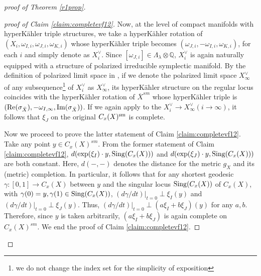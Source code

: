 \documentclass[12pt,a4paper]{amsart}
\theoremstyle{remark}
\theoremstyle{definition}
\def\Q{\mathbb{Q}}
\begin{document}
\begin{proof}[proof of Theorem \ref{r1prop}]
\begin{proof}[proof of Claim \ref{claim:completevf12}]
Now, 
at the level of 
compact 
manifolds with hyperK\"ahler triple structures, 
we take a hyperK\"ahler rotation 
of $(X_i,\omega_{I,i},\omega_{J,i},\omega_{K,i})$ 
whose hyperK\"ahler triple becomes  
$(\omega_{J,i}, -\omega_{I,i}, \omega_{K,i})$, 
for each $i$ and simply denote as 
$X_i^{\vee}$. 
Since $[\omega_{J,i}]\in \Lambda_\lambda\otimes \Q$, 
$X_i^{\vee}$ is again 
naturally equipped with a structure of 
polarized irreducible symplectic manifold. 
By the definition of polarized limit space in 
\cite[\S 2]{DSII}, if we denote 
the polarized limit space $X_\infty^{\vee}$ of 
any subsequence\footnote{we do not change the index set for the simplicity of exposition} of 
$X_i^{\vee}$ as $X_\infty^{\vee}$, 
its hyperK\"ahler structure on the regular locus 
coincides with the hyperK\"ahler rotation of 
$\overline{X}^{sm}$ whose hyperK\"ahler triple is 
$({\rm Re}(\sigma_{\bar X}), -\omega_{I,\infty}, 
{\rm Im}(\sigma_{\bar X}))$. 
If we again apply \cite[Lemma 2.17]{DSII} 
to the $X_i^{\vee}\to X_\infty^{\vee} (i\to \infty)$, 
it follows that $\xi_J$ on the original 
$C_x(X)^{\rm sm}$ is complete. 

Now we proceed to prove the latter statement of 
Claim \ref{claim:completevf12}. 
Take any point $y\in C_x(X)^{sm}$. 
From the 
former statement of Claim \ref{claim:completevf12}, 
$d({\rm exp}(\xi_I)\cdot y,{\rm Sing}(C_x(X)))$ and 
$d({\rm exp}(\xi_J)\cdot y,{\rm Sing}(C_x(X)))$ are both 
constant. 
Here, $d(-,-)$ denotes the distance for the 
metric $g_X$ and its (metric) completion. 
In particular, 
it follows that for any shortest geodesic $\gamma 
\colon [0,1]\to C_x(X)$ 
between $y$ and the singular locus 
${\rm Sing}(C_x(X))$ 
of $C_x(X)$, with $\gamma(0)=y, \gamma(1)\in {\rm Sing}
(C_x(X))$, $(d\gamma/dt)|_{t=0}\perp \xi_I(y)$ 
and $(d\gamma/dt)|_{t=0}\perp \xi_J(y)$. 
Thus, $(d\gamma/dt)|_{t=0}\perp (a\xi_I+b\xi_J)(y)$ 
for any $a,b$. Therefore, since $y$ is taken 
arbitrarily, 
$(a\xi_I+b\xi_J)$ is again complete on $C_x(X)^{sm}$. 
We end the proof of Claim \ref{claim:completevf12}. 
\end{proof}


\end{proof}
\end{document}

